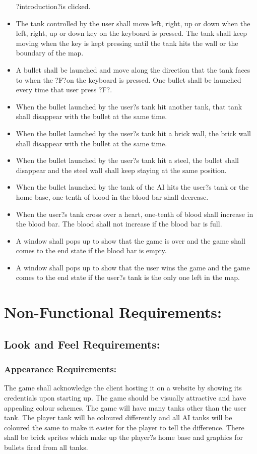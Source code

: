 \documentclass{article}
\begin{document}
\begin{itemize}
?introduction?is clicked.
\item The tank controlled by the user shall move left, right, up or down when 
the left, right, up or down key on the keyboard is pressed. The tank shall keep
 moving when the key is kept pressing until the tank hits the wall or the 
 boundary of the map.
\item A bullet shall be launched and move along the direction that the tank
 faces to when the ?F?on the keyboard is pressed. One bullet shall be launched 
 every time that user press ?F?.
\item When the bullet launched by the user?s tank hit another tank, that tank 
shall disappear with the bullet at the same time.
\item When the bullet launched by the user?s tank hit a brick wall, the brick 
wall shall disappear with the bullet at the same time.
\item When the bullet launched by the user?s tank hit a steel, the bullet shall 
disappear and the steel wall shall keep staying at the same position.
\item When the bullet launched by the tank of the AI hits the user?s tank or the 
home base, one-tenth of blood in the blood bar shall decrease.
\item When the user?s tank cross over a heart, one-tenth of blood shall increase
 in the blood bar. The blood shall not increase if the blood bar is full.
\item A window shall pops up to show that the game is over and the game shall
 comes to the end state if the blood bar is empty.
\item A window shall pops up to show that the user wins the game and the game
 comes to the end state if the user?s tank is the only one left in the map.
\end{itemize}

\section{Non-Functional Requirements:}
\subsection{Look and Feel Requirements:}

\subsubsection{Appearance Requirements:}
The game shall acknowledge the client hosting it on a website by showing its
credentials upon starting up. The game should be visually attractive and have
appealing colour schemes. The game will have many tanks other than the user
tank. The player tank will be coloured differently and all AI tanks will be
coloured the same to make it easier for the player to tell the difference. There
shall be brick sprites which make up the player?s home base and graphics for
bullets fired from all tanks.
\end{document}
